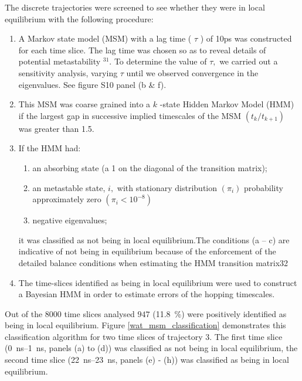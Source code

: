 The discrete trajectories were screened to see whether they were in local equilibrium with the following procedure:
\begin{enumerate}
    \item A Markov state model (MSM) with a lag time ( $\tau$ ) of 10ps was constructed for each time slice. The lag time was chosen so as to reveal details of potential metastability $^{31} .$ To determine the value of $\tau,$ we carried out a sensitivity analysis, varying $\tau$ until we observed convergence in the eigenvalues. See figure S10 panel (b \& f).
    \item This MSM was coarse grained into a $k$ -state Hidden Markov Model (HMM) if the largest gap in successive implied timescales of the MSM $\left(t_{k} / t_{k+1}\right)$ was greater than 1.5. 
    \item If the HMM had:
    \begin{enumerate}
        \item an absorbing state (a 1 on the diagonal of the transition matrix);
        \item an metastable state, $i,$ with stationary distribution $\left(\pi_{i}\right)$ probability approximately zero $\left(\pi_{i}< 10^{-8}\right)$
        \item negative eigenvalues; 
    \end{enumerate}
    it was classified as not being in local equilibrium.The conditions (a – c) are indicative of not being in equilibrium because of the enforcement of the detailed balance conditions when estimating the HMM transition matrix32
    \item The time-slices identified as being in local equilibrium were used to construct a Bayesian HMM in order to estimate errors of the hopping timescales. 
\end{enumerate}

Out of the $8000$ time slices analysed $947$ (\SI{11.8}{\percent}) were positively identified as being in local equilibrium. Figure \ref{wat_msm_classification} demonstrates this classification algorithm for two time slices of trajectory $3$. The first time slice (\SIrange{0}{1}{\nano\second}, panels (a) to (d)) was classified as not being in local equilibrium, the second time slice (\SIrange{22}{23}{\nano\second}, panels (e) - (h)) was classified as being in local equilibrium.

